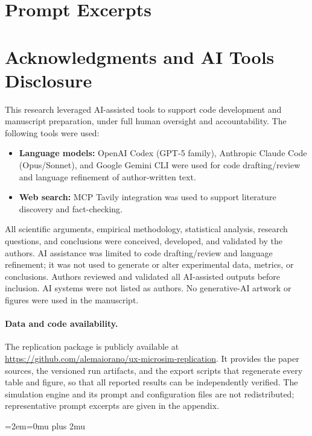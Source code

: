 \documentclass[10pt]{article}
\begin{document}
\section{Prompt Excerpts}


\section*{Acknowledgments and AI Tools Disclosure}
This research leveraged AI-assisted tools to support code development and manuscript preparation, under full human oversight and accountability. The following tools were used:
\begin{itemize}
    \item \textbf{Language models:} OpenAI Codex (GPT-5 family), Anthropic Claude Code (Opus/Sonnet), and Google Gemini CLI were used for code drafting/review and language refinement of author-written text.
    \item \textbf{Web search:} MCP Tavily integration was used to support literature discovery and fact-checking.
\end{itemize}
All scientific arguments, empirical methodology, statistical analysis, research questions, and conclusions were conceived, developed, and validated by the authors. AI assistance was limited to code drafting/review and language refinement; it was not used to generate or alter experimental data, metrics, or conclusions. Authors reviewed and validated all AI-assisted outputs before inclusion. AI systems were not listed as authors. No generative-AI artwork or figures were used in the manuscript.

\paragraph{Data and code availability.}
The replication package is publicly available at \url{https://github.com/alemaiorano/ux-microsim-replication}. It provides the paper sources, the versioned run artifacts, and the export scripts that regenerate every table and figure, so that all reported results can be independently verified. The simulation engine and its prompt and configuration files are not redistributed; representative prompt excerpts are given in the appendix.

{\sloppy{}\emergencystretch=2em\Urlmuskip=0mu plus 2mu\relax


}
\end{document}

